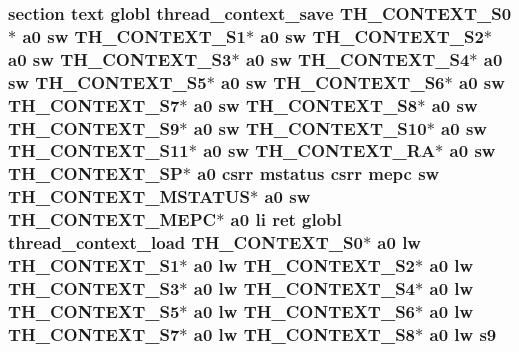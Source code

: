 \hypertarget{riscv_2threada_8S_a8f561c8d610d0fbd9af92b7b2b33f8c7}{
\subsubsection[{s9}]{\setlength{\rightskip}{0pt plus 5cm}section text globl {\bf thread\-\_\-context\-\_\-save} {\bf T\-H\-\_\-\-C\-O\-N\-T\-E\-X\-T\-\_\-\-S0}$\ast$ {\bf a0} {\bf sw} {\bf T\-H\-\_\-\-C\-O\-N\-T\-E\-X\-T\-\_\-\-S1}$\ast$ {\bf a0} {\bf sw} {\bf T\-H\-\_\-\-C\-O\-N\-T\-E\-X\-T\-\_\-\-S2}$\ast$ {\bf a0} {\bf sw} {\bf T\-H\-\_\-\-C\-O\-N\-T\-E\-X\-T\-\_\-\-S3}$\ast$ {\bf a0} {\bf sw} {\bf T\-H\-\_\-\-C\-O\-N\-T\-E\-X\-T\-\_\-\-S4}$\ast$ {\bf a0} {\bf sw} {\bf T\-H\-\_\-\-C\-O\-N\-T\-E\-X\-T\-\_\-\-S5}$\ast$ {\bf a0} {\bf sw} {\bf T\-H\-\_\-\-C\-O\-N\-T\-E\-X\-T\-\_\-\-S6}$\ast$ {\bf a0} {\bf sw} {\bf T\-H\-\_\-\-C\-O\-N\-T\-E\-X\-T\-\_\-\-S7}$\ast$ {\bf a0} {\bf sw} {\bf T\-H\-\_\-\-C\-O\-N\-T\-E\-X\-T\-\_\-\-S8}$\ast$ {\bf a0} {\bf sw} {\bf T\-H\-\_\-\-C\-O\-N\-T\-E\-X\-T\-\_\-\-S9}$\ast$ {\bf a0} {\bf sw} {\bf T\-H\-\_\-\-C\-O\-N\-T\-E\-X\-T\-\_\-\-S10}$\ast$ {\bf a0} {\bf sw} {\bf T\-H\-\_\-\-C\-O\-N\-T\-E\-X\-T\-\_\-\-S11}$\ast$ {\bf a0} {\bf sw} {\bf T\-H\-\_\-\-C\-O\-N\-T\-E\-X\-T\-\_\-\-R\-A}$\ast$ {\bf a0} {\bf sw} {\bf T\-H\-\_\-\-C\-O\-N\-T\-E\-X\-T\-\_\-\-S\-P}$\ast$ {\bf a0} csrr {\bf mstatus} csrr {\bf mepc} {\bf sw} {\bf T\-H\-\_\-\-C\-O\-N\-T\-E\-X\-T\-\_\-\-M\-S\-T\-A\-T\-U\-S}$\ast$ {\bf a0} {\bf sw} {\bf T\-H\-\_\-\-C\-O\-N\-T\-E\-X\-T\-\_\-\-M\-E\-P\-C}$\ast$ {\bf a0} {\bf li} ret globl {\bf thread\-\_\-context\-\_\-load} {\bf T\-H\-\_\-\-C\-O\-N\-T\-E\-X\-T\-\_\-\-S0}$\ast$ {\bf a0} {\bf lw} {\bf T\-H\-\_\-\-C\-O\-N\-T\-E\-X\-T\-\_\-\-S1}$\ast$ {\bf a0} {\bf lw} {\bf T\-H\-\_\-\-C\-O\-N\-T\-E\-X\-T\-\_\-\-S2}$\ast$ {\bf a0} {\bf lw} {\bf T\-H\-\_\-\-C\-O\-N\-T\-E\-X\-T\-\_\-\-S3}$\ast$ {\bf a0} {\bf lw} {\bf T\-H\-\_\-\-C\-O\-N\-T\-E\-X\-T\-\_\-\-S4}$\ast$ {\bf a0} {\bf lw} {\bf T\-H\-\_\-\-C\-O\-N\-T\-E\-X\-T\-\_\-\-S5}$\ast$ {\bf a0} {\bf lw} {\bf T\-H\-\_\-\-C\-O\-N\-T\-E\-X\-T\-\_\-\-S6}$\ast$ {\bf a0} {\bf lw} {\bf T\-H\-\_\-\-C\-O\-N\-T\-E\-X\-T\-\_\-\-S7}$\ast$ {\bf a0} {\bf lw} {\bf T\-H\-\_\-\-C\-O\-N\-T\-E\-X\-T\-\_\-\-S8}$\ast$ {\bf a0} {\bf lw} s9}}\label{riscv_2threada_8S_a8f561c8d610d0fbd9af92b7b2b33f8c7}
